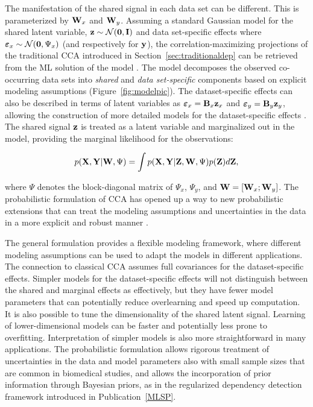 \noindent The manifestation of the shared signal in each data set can
be different. This is parameterized by \(\mathbf{W}_x\) and \(\mathbf{W}_y\).
Assuming a standard Gaussian model for the shared latent variable,
\(\mathbf{z} \sim \mathcal{N}(\mathbf{0},\mathbf{I})\) and data set-specific effects where \(\boldsymbol{\varepsilon}_x \sim
\mathcal{N}(\mathbf{0}, \Psi_x)\) (and respectively for \(\mathbf{y}\)), the
correlation-maximizing projections of the traditional CCA introduced
in Section~\ref{sec:traditionaldep} can be retrieved from the ML
solution of the model \citep{Archambeau06, Bach05}. The model
decomposes the observed co-occurring data sets into {\it shared} and
{\it data set-specific} components based on explicit modeling
assumptions (Figure~\ref{fig:modelpic}). The dataset-specific effects
can also be described in terms of latent variables as \(\boldsymbol{\varepsilon}_x =
\mathbf{B}_x\mathbf{z}_x\) and \(\boldsymbol{\varepsilon}_y = \mathbf{B}_y\mathbf{z}_y\), allowing the construction of more
detailed models for the dataset-specific effects \citep{Klami08}. The
shared signal \(\mathbf{z}\) is treated as a latent variable and marginalized
out in the model, providing the marginal likelihood for the
observations:

\begin{equation}\label{eq:ccalikelihood}
    p(\mathbf{X},\mathbf{Y}|\mathbf{W},\Psi) = \int p(\mathbf{X}, \mathbf{Y}|\mathbf{Z}, \mathbf{W}, \Psi)p(\mathbf{Z}) d\mathbf{Z},
\end{equation}

\noindent where \(\Psi\) denotes the block-diagonal matrix of
\(\Psi_x\), \(\Psi_y\), and \(\mathbf{W} = [\mathbf{W}_x; \mathbf{W}_y]\).  The probabilistic
formulation of CCA has opened up a way to new probabilistic extensions
that can treat the modeling assumptions and uncertainties in the data
in a more explicit and robust manner \citep{Archambeau06, Klami08,
Klami10uai}.

The general formulation provides a flexible modeling framework, where
different modeling assumptions can be used to adapt the models in
different applications. The connection to classical CCA assumes full
covariances for the dataset-specific effects. Simpler models for the
dataset-specific effects will not distinguish between the shared and
marginal effects as effectively, but they have fewer model parameters
that can potentially reduce overlearning and speed up computation.  It
is also possible to tune the dimensionality of the shared latent
signal. Learning of lower-dimensional models can be faster and
potentially less prone to overfitting. Interpretation of simpler
models is also more straightforward in many applications. The
probabilistic formulation allows rigorous treatment of uncertainties
in the data and model parameters also with small sample sizes that are
common in biomedical studies, and allows the incorporation of prior
information through Bayesian priors, as in the regularized dependency
detection framework introduced in Publication~\ref{MLSP}.


